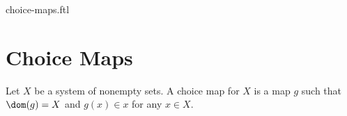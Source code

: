 \documentclass{naproche-library}
\begin{document}
\begin{smodule}{choice-maps.ftl}

  \section*{Choice Maps}

  \begin{definition*}[forthel,id=FOUNDATIONS_10_1352015487625913]
    Let $X$ be a system of nonempty sets.
    A choice map for $X$ is a map $g$ such that $\dom(g) = X$ and $g(x) \in x$ for any $x \in X$.
  \end{definition*}
\end{smodule}
\end{document}
